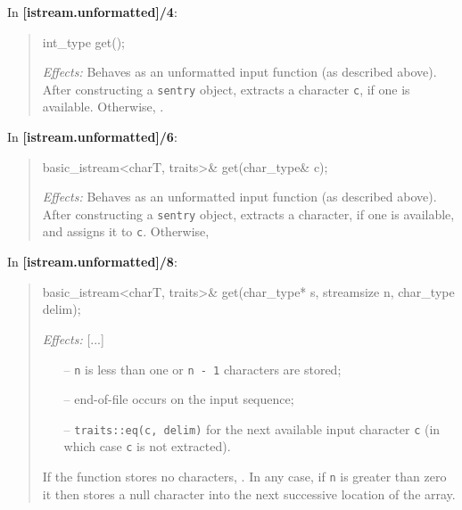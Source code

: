 \documentclass{wg21}
\begin{document}
In \textbf{[istream.unformatted]/4}:
\begin{quote}
\begin{codeblock}
int_type get();
\end{codeblock}
\textit{Effects:} Behaves as an unformatted input function (as described above).
After constructing a \texttt{sentry} object, extracts a character \texttt{c}, if one is
available. Otherwise, .
\end{quote}

In \textbf{[istream.unformatted]/6}:
\begin{quote}
\begin{codeblock}
basic_istream<charT, traits>& get(char_type& c);
\end{codeblock}
\textit{Effects:} Behaves as an unformatted input function (as described above).
After constructing a \texttt{sentry} object, extracts a character, if one is
available, and assigns it to \texttt{c}. Otherwise, 
\end{quote}

In \textbf{[istream.unformatted]/8}:
\begin{quote}
\begin{codeblock}
basic_istream<charT, traits>& get(char_type* s, streamsize n, char_type delim);
\end{codeblock}
\textit{Effects:} [...]
\begin{itemize}
  \item[--] \texttt{n} is less than one or \texttt{n - 1} characters are stored;
  \item[--] end-of-file occurs on the input sequence;
  \item[--] \texttt{traits::eq(c, delim)} for the next available input character
            \texttt{c} (in which case \texttt{c} is not extracted).
\end{itemize}
If the function stores no characters, .
In any case, if \texttt{n} is greater than zero it then stores a null character into the
next successive location of the array.
\end{quote}
\end{document}
